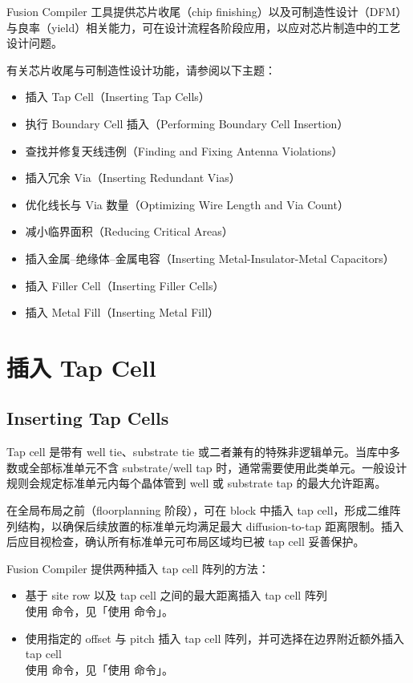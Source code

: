 \label{chap:dfm}

Fusion Compiler 工具提供芯片收尾（chip finishing）以及可制造性设计（DFM）与良率（yield）相关能力，可在设计流程各阶段应用，以应对芯片制造中的工艺设计问题。

有关芯片收尾与可制造性设计功能，请参阅以下主题：
\begin{itemize}
  \item 插入 Tap Cell（Inserting Tap Cells）
  \item 执行 Boundary Cell 插入（Performing Boundary Cell Insertion）
  \item 查找并修复天线违例（Finding and Fixing Antenna Violations）
  \item 插入冗余 Via（Inserting Redundant Vias）
  \item 优化线长与 Via 数量（Optimizing Wire Length and Via Count）
  \item 减小临界面积（Reducing Critical Areas）
  \item 插入金属--绝缘体--金属电容（Inserting Metal-Insulator-Metal Capacitors）
  \item 插入 Filler Cell（Inserting Filler Cells）
  \item 插入 Metal Fill（Inserting Metal Fill）
\end{itemize}

\section{插入 Tap Cell}
\subsection*{Inserting Tap Cells}

Tap cell 是带有 well tie、substrate tie 或二者兼有的特殊非逻辑单元。当库中多数或全部标准单元不含 substrate/well tap 时，通常需要使用此类单元。一般设计规则会规定标准单元内每个晶体管到 well 或 substrate tap 的最大允许距离。

在全局布局之前（floorplanning 阶段），可在 block 中插入 tap cell，形成二维阵列结构，以确保后续放置的标准单元均满足最大 diffusion-to-tap 距离限制。插入后应目视检查，确认所有标准单元可布局区域均已被 tap cell 妥善保护。

Fusion Compiler 提供两种插入 tap cell 阵列的方法：
\begin{itemize}
  \item 基于 site row 以及 tap cell 之间的最大距离插入 tap cell 阵列\\
        使用  命令，见「使用  命令」。
  \item 使用指定的 offset 与 pitch 插入 tap cell 阵列，并可选择在边界附近额外插入 tap cell\\
        使用  命令，见「使用  命令」。
\end{itemize}

